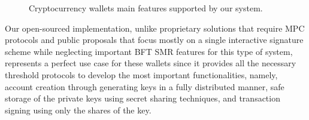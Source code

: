 \begin{figure}[h]
    \begin{center}
    \end{center}
    \caption{Cryptocurrency wallets main features supported by our system.}
    \label{fig:3.cryptowalletfeatures}
\end{figure}

Our open-sourced implementation, unlike proprietary solutions that require MPC protocols and public proposals that focus mostly on a single interactive signature scheme while neglecting important BFT SMR features for this type of system, represents a perfect use case for these wallets since it provides all the necessary threshold protocols to develop the most important functionalities, namely, account creation through generating keys in a fully distributed manner, safe storage of the private keys using secret sharing techniques, and transaction signing using only the shares of the key.

